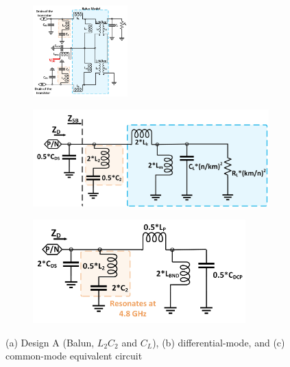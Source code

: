 \documentclass[conference]{IEEEtran}
\begin{document}
\begin{figure}[!t]
\captionsetup{font=footnotesize}
\centering
\begin{subfigure}{0.5\textwidth}
\centering
\includegraphics[width=0.4\textwidth]{Images/Design/Design_A_FC.jpg}
\caption{}
\label{fig:Design_A_FC}
\end{subfigure}
\begin{subfigure}[b]{0.24\textwidth}
\includegraphics[width=1\textwidth]{Images/Design/Design_A_Diff.jpg}
\caption{}
\label{fig:Design_A_Diff}
\end{subfigure}
\begin{subfigure}[b]{0.24\textwidth}
\includegraphics[width=0.9\textwidth]{Images/Design/Design_A_Com.jpg}
\caption{}
\label{fig:Design_A_Com}
\end{subfigure}
\caption{(a) Design A (Balun, $L_2C_2$ and $C_L$), (b) differential-mode, and (c) common-mode equivalent circuit }
\label{fig:Design_A}
\vspace{-0.2in}
\end{figure}
\end{document}
